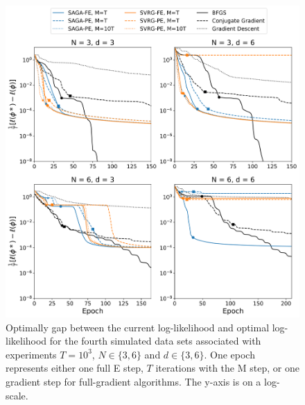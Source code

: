 \documentclass[12pt]{article}
\begin{document}
\begin{figure}[H]
    \centering
    \includegraphics[width=6.5in]{../plt/log-like_v_epoch_T-1000-003.png}
    \caption{Optimally gap between the current log-likelihood and optimal log-likelihood for the fourth simulated data sets associated with experiments $T=10^{3}$, $N \in \{3,6\}$ and $d \in \{3,6\}$. One epoch represents either one full E step, $T$ iterations with the M step, or one gradient step for full-gradient algorithms. The y-axis is on a log-scale.}
\end{figure}
%
\end{document}
